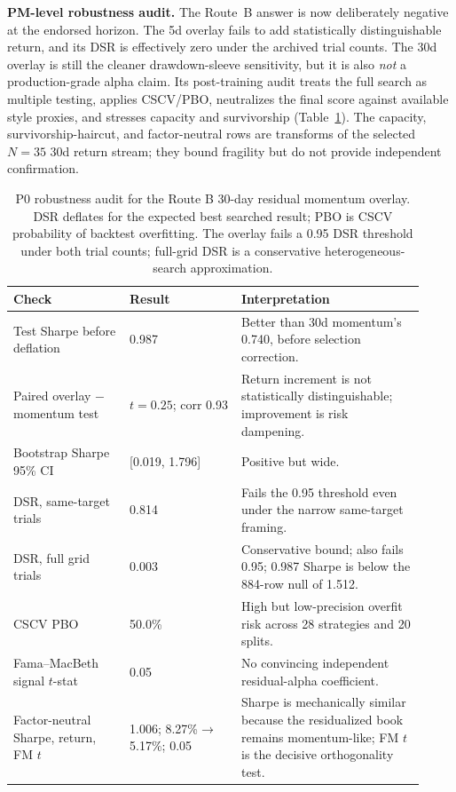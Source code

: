 \documentclass[9pt]{extarticle}
\begin{document}
\textbf{PM-level robustness audit.} The Route~B answer is now deliberately
negative at the endorsed horizon. The 5d overlay fails to add statistically
distinguishable return, and its DSR is effectively zero under the archived trial
counts. The 30d overlay is still the cleaner drawdown-sleeve sensitivity, but it
is also \emph{not} a production-grade alpha claim. Its post-training audit treats
the full search as multiple testing, applies CSCV/PBO, neutralizes the final
score against available style proxies, and stresses capacity and survivorship
(Table~\ref{tab:p0audit}). The capacity, survivorship-haircut, and
factor-neutral rows are transforms of the selected $N=35$ 30d return stream;
they bound fragility but do not provide independent confirmation.

\begin{table}[H]
  \centering
  \caption{P0 robustness audit for the Route B 30-day residual momentum overlay.
  DSR deflates for the expected best searched result; PBO is CSCV probability of
  backtest overfitting. The overlay fails a 0.95 DSR threshold under both trial
  counts; full-grid DSR is a conservative heterogeneous-search approximation.}\label{tab:p0audit}
  \scriptsize
  \setlength{\tabcolsep}{3pt}
  \begin{tabular}{p{0.26\linewidth}p{0.25\linewidth}p{0.41\linewidth}}
    \toprule
    Check & Result & Interpretation \\
    \midrule
    Test Sharpe before deflation & 0.987 & Better than 30d momentum's 0.740, before selection correction. \\
    Paired overlay $-$ momentum test & $t=0.25$; corr 0.93 & Return increment is not statistically distinguishable; improvement is risk dampening. \\
    Bootstrap Sharpe 95\% CI & [0.019, 1.796] & Positive but wide. \\
    DSR, same-target trials & 0.814 & Fails the 0.95 threshold even under the narrow same-target framing. \\
    DSR, full grid trials & 0.003 & Conservative bound; also fails 0.95; 0.987 Sharpe is below the 884-row null of 1.512. \\
    CSCV PBO & 50.0\% & High but low-precision overfit risk across 28 strategies and 20 splits. \\
    Fama--MacBeth signal $t$-stat & 0.05 & No convincing independent residual-alpha coefficient. \\
    Factor-neutral Sharpe, return, FM $t$ & 1.006; 8.27\%$\rightarrow$5.17\%; 0.05 & Sharpe is mechanically similar because the residualized book remains momentum-like; FM $t$ is the decisive orthogonality test. \\

\end{tabular}
\end{table}
\end{document}

